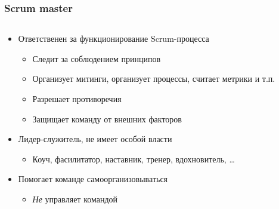 \documentclass{../../slides-style}
\begin{document}
    \begin{frame}
        \frametitle{Scrum master}
        \begin{columns}
            \begin{column}{0.7\textwidth}
                \begin{itemize}
                    \item Ответственен за функционирование Scrum-процесса
                    \begin{itemize}
                        \item Следит за соблюдением принципов
                        \item Организует митинги, организует процессы, считает метрики и т.п.
                        \item Разрешает противоречия
                        \item Защищает команду от внешних факторов
                    \end{itemize}
                    \item Лидер-служитель, не имеет особой власти
                    \begin{itemize}
                        \item Коуч, фасилитатор, наставник, тренер, вдохновитель, \dots
                    \end{itemize}
                    \item Помогает команде самоорганизовываться
                    \begin{itemize}
                        \item \emph{Не} управляет командой
                    \end{itemize}
                \end{itemize}
            \end{column}
            \begin{column}{0.3\textwidth}
                \strut
                \begin{center}

\end{center}
\end{column}
\end{columns}
\end{frame}
\end{document}
